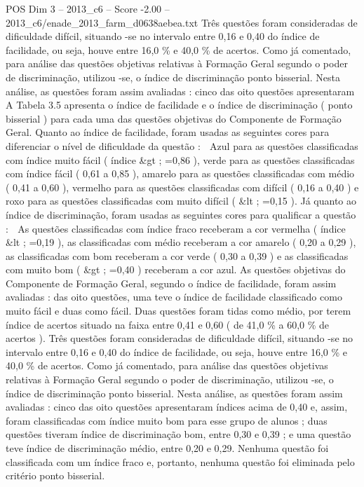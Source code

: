 \begin{textsample}{POS Dim 3 – 2013\_c6 – Score -2.00 – 2013\_c6/enade\_2013\_farm\_d0638aebea.txt}
Três questões foram consideradas de dificuldade difícil, situando -se no intervalo entre 0,16 e 0,40 do índice de facilidade, ou seja, houve entre 16,0 \% e 40,0 \% de acertos.
Como já comentado, para análise das questões objetivas relativas à Formação Geral segundo o poder de discriminação, utilizou -se, o índice de discriminação ponto bisserial.
Nesta análise, as questões foram assim avaliadas : cinco das oito questões apresentaram A Tabela 3.5 apresenta o índice de facilidade e o índice de discriminação ( ponto bisserial ) para cada uma das questões objetivas do Componente de Formação Geral.
Quanto ao índice de facilidade, foram usadas as seguintes cores para diferenciar o nível de dificuldade da questão :  Azul para as questões classificadas com índice muito fácil ( índice \&gt ; =0,86 ), verde para as questões classificadas com índice fácil ( 0,61 a 0,85 ), amarelo para as questões classificadas com médio ( 0,41 a 0,60 ), vermelho para as questões classificadas com difícil ( 0,16 a 0,40 ) e roxo para as questões classificadas com muito difícil ( \&lt ; =0,15 ).
Já quanto ao índice de discriminação, foram usadas as seguintes cores para qualificar a questão :  As questões classificadas com índice fraco receberam a cor vermelha ( índice \&lt ; =0,19 ), as classificadas com médio receberam a cor amarelo ( 0,20 a 0,29 ), as classificadas com bom receberam a cor verde ( 0,30 a 0,39 ) e as classificadas com muito bom ( \&gt ; =0,40 ) receberam a cor azul.
As questões objetivas do Componente de Formação Geral, segundo o índice de facilidade, foram assim avaliadas : das oito questões, uma teve o índice de facilidade classificado como muito fácil e duas como fácil.
Duas questões foram tidas como médio, por terem índice de acertos situado na faixa entre 0,41 e 0,60 ( de 41,0 \% a 60,0 \% de acertos ).
Três questões foram consideradas de dificuldade difícil, situando -se no intervalo entre 0,16 e 0,40 do índice de facilidade, ou seja, houve entre 16,0 \% e 40,0 \% de acertos.
Como já comentado, para análise das questões objetivas relativas à Formação Geral segundo o poder de discriminação, utilizou -se, o índice de discriminação ponto bisserial.
Nesta análise, as questões foram assim avaliadas : cinco das oito questões apresentaram índices acima de 0,40 e, assim, foram classificadas com índice muito bom para esse grupo de alunos ; duas questões tiveram índice de discriminação bom, entre 0,30 e 0,39 ; e uma questão teve índice de discriminação médio, entre 0,20 e 0,29.
Nenhuma questão foi classificada com um índice fraco e, portanto, nenhuma questão foi eliminada pelo critério ponto bisserial.

\end{textsample}
